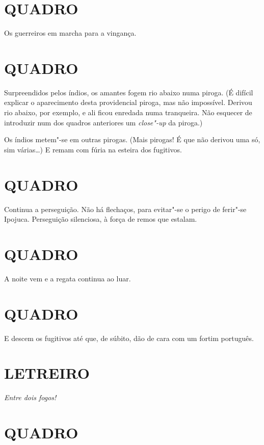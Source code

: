 \section*{QUADRO}

Os guerreiros em marcha para a vingança.

\section*{QUADRO}

Surpreendidos pelos índios, os amantes fogem rio abaixo numa piroga. (É
difícil explicar o aparecimento desta providencial piroga, mas não
impossível. Derivou rio abaixo, por exemplo, e ali ficou enredada numa
tranqueira. Não esquecer de introduzir num dos quadros anteriores um
\emph{close"-up} da piroga.)

Os índios metem"-se em outras pirogas. (Mais pirogas! É que não derivou
uma só, sim várias\ldots{}) E remam com fúria na esteira dos fugitivos.

\section*{QUADRO}

Continua a perseguição. Não há flechaços, para evitar"-se o perigo de
ferir"-se Ipojuca. Perseguição silenciosa, à força de remos que estalam.

\section*{QUADRO}

A noite vem e a regata continua ao luar.

\section*{QUADRO}

E descem os fugitivos até que, de súbito, dão de cara com um fortim
português.

\section*{LETREIRO}

\emph{Entre dois fogos!}

\section*{QUADRO}

